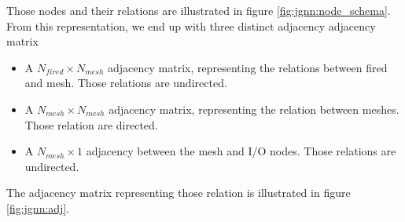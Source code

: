 \documentclass[../main.tex]{subfiles}
\begin{document}
\hfill

Those nodes and their relations are illustrated in figure \ref{fig:jgnn:node_schema}. From this representation, we end up with three distinct adjacency adjacency matrix
\begin{itemize}
  \item A $N_{fired} \times N_{mesh}$ adjacency matrix, representing the relations between fired and mesh. Those relations are undirected.
  \item A $N_{mesh} \times N_{mesh}$ adjacency matrix, representing the relation between meshes. Those relation are directed.
  \item A $N_{mesh} \times 1$ adjacency between the mesh and I/O nodes. Those relations are undirected.
\end{itemize}
The adjacency matrix representing those relation is illustrated in figure \ref{fig:jgnn:adj}.
\end{document}
